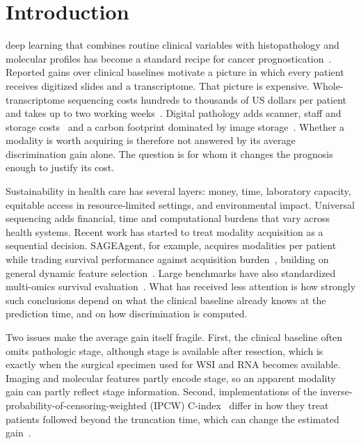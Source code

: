 \documentclass[journal,twoside]{IEEEtran}
\begin{document}
\section{Introduction}
 deep learning that combines routine clinical variables with histopathology and molecular profiles has become a standard recipe for cancer prognostication~\cite{cheerla2019,chen2022,valesilva2021}. Reported gains over clinical baselines motivate a picture in which every patient receives digitized slides and a transcriptome. That picture is expensive. Whole-transcriptome sequencing costs hundreds to thousands of US dollars per patient and takes up to two working weeks~\cite{altburger2026,ortendahl2025,cuppen2022}. Digital pathology adds scanner, staff and storage costs~\cite{ardon2023} and a carbon footprint dominated by image storage~\cite{tilmant2026,vafaeisadr2024}. Whether a modality is worth acquiring is therefore not answered by its average discrimination gain alone. The question is for whom it changes the prognosis enough to justify its cost.

Sustainability in health care has several layers: money, time, laboratory capacity, equitable access in resource-limited settings, and environmental impact. Universal sequencing adds financial, time and computational burdens that vary across health systems. Recent work has started to treat modality acquisition as a sequential decision. SAGEAgent, for example, acquires modalities per patient while trading survival performance against acquisition burden~\cite{qu2026}, building on general dynamic feature selection~\cite{covert2023,ji2007,shim2018}. Large benchmarks have also standardized multi-omics survival evaluation~\cite{wissel2025}. What has received less attention is how strongly such conclusions depend on what the clinical baseline already knows at the prediction time, and on how discrimination is computed.

Two issues make the average gain itself fragile. First, the clinical baseline often omits pathologic stage, although stage is available after resection, which is exactly when the surgical specimen used for WSI and RNA becomes available. Imaging and molecular features partly encode stage, so an apparent modality gain can partly reflect stage information. Second, implementations of the inverse-probability-of-censoring-weighted (IPCW) C-index~\cite{uno2011} differ in how they treat patients followed beyond the truncation time, which can change the estimated gain~\cite{sonabend2022}.
\end{document}

